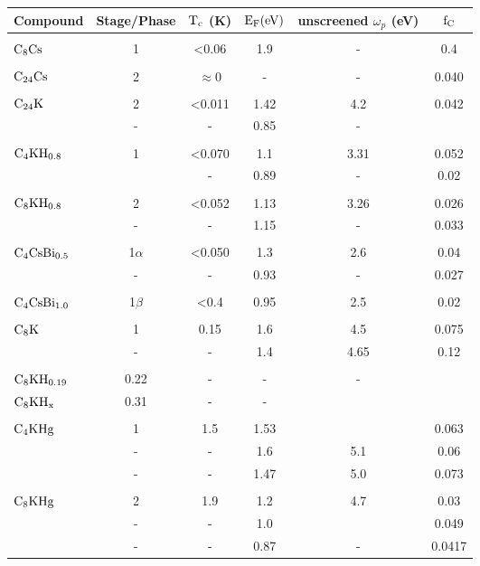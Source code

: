 
%


\begin{tabular}{|lc|cccc|}
Compound & Stage/Phase & $\rm T_c$ (K) & $\rm E_F (eV)$ & unscreened $\omega_p$ (eV) & $\rm f_C$ \\
\hline\\
$\rm C_8Cs$ & 1 & <0.06\cite{tanuma81} & 1.9\cite{lagues84}&-& 0.4\cite{takahashi86,dicenzo86}\\
& & & & & \\
$\rm C_{24}Cs$ & 2 & $\approx$0 &-&-& 0.040\cite{fretigny85}\\
& & & & & \\
$\rm C_{24}K$ & 2 & <0.011\cite{koike80} & 1.42\cite{doll87} & 4.2 & 0.042\cite{doll87,I63,preil84}\\
&-&-& 0.85\cite{preil84,preil83} &-& \\
& & & & & \\
$\rm C_4KH_{0.8}$& 1 & <0.070 & 1.1\cite{doll87} & 3.31 & 0.052\cite{doll87}\\
& &-& 0.89\cite{O353} & - & 0.02\cite{Z260}\\
& & & & & \\
$\rm C_8KH_{0.8}$ & 2 & <0.052\cite{sano80} & 1.13\cite{doll87} & 3.26\cite{doll87} & 0.026\cite{doll87} \\
&-&-& 1.15\cite{Z260} &-& 0.033\cite{Z260}\\
& & & & & \\
$\rm C_4CsBi_{0.5}$ & 1$\alpha$ & <0.050\cite{stang88} & 1.3\cite{yang88} & 2.6\cite{yang88} & 0.04\cite{yang88}\\
&-&-& 0.93 &-& 0.027\\
& & & & & \\
$\rm C_4CsBi_{1.0}$ & 1$\beta$ & <0.4\cite{E291} & 0.95\cite{yang88} & 2.5\cite{yang88} & 0.02\\
& & & & & \\
$\rm C_8K$ & 1 & 0.15\cite{kaneiwa82} & 1.6\cite{doll87} & 4.5\cite{doll87} & 0.075\cite{tanuma78}\\
&-&-& 1.4\cite{tanuma78} & 4.65\cite{fischer85} & 0.12\cite{preil84}\\
& & & & & \\
$\rm C_8KH_{0.19}$ & 0.22\cite{kaneiwa82} & - & - & -\\
$\rm C_8KH_x$ & 0.31\cite{suzuki85b} & - & - & \\
& & & & & \\
$\rm C_4KHg$ & 1 & 1.5\cite{W179} & 1.53\cite{W179} &  & 0.063\cite{W179}\\
&-&-& 1.6\cite{yang88} & 5.1\cite{yang88} & 0.06\cite{yang88}\\
&-&-& 1.47\cite{preil84} & 5.0\cite{fischer85} & 0.073\cite{conard81}\\
& & & & & \\
$\rm C_8KHg$ & 2 & 1.9\cite{pendrys81} & 1.2 & 4.7\cite{yang88} & 0.03\cite{yang88} \\
&-&-& 1.0\cite{W179}  &  & 0.049\cite{W179} \\
&-&-& 0.87\cite{preil84} &-& 0.0417\cite{preil84}\\
\end{tabular}



